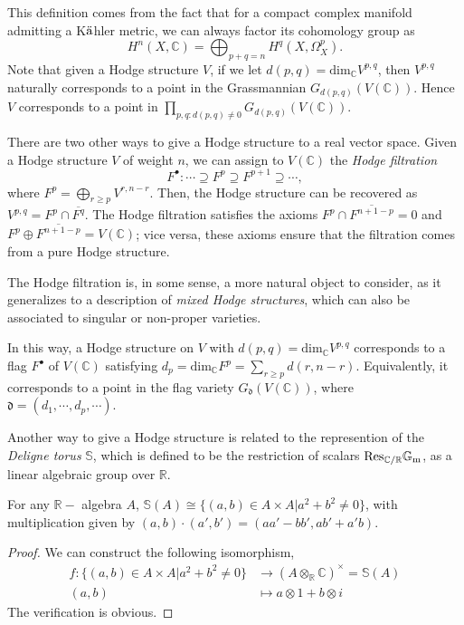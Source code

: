 \begin{remark}
 \label{remark-Hodge-structures}
 This definition comes from the fact that for a compact complex manifold admitting a K$\rm \ddot a$hler metric, we can always factor its cohomology group as
$$
H^n(X, \mathbb C)= \bigoplus _{ p+q=n}H^q(X, \Omega^p_X).
$$
Note that given a Hodge structure $V$, if we let $d(p,q)= \text{dim}_\mathbb C V^{p,q}$, then $V^{p,q}$ naturally corresponds to a point in the Grassmannian $G_{d(p,q)}(V(\mathbb C))$. Hence $V$ corresponds to a point in $\prod_{p,q:d(p,q)\ne 0} G_{d(p,q)}(V(\mathbb C))$.
\end{remark}

There are two other ways to give a Hodge structure to a real vector space. Given a Hodge structure $V$ of weight $n$, we can assign to $V(\mathbb  C)$ the {\it Hodge filtration}
$$
F^ \bullet : \cdots \supseteq F^p \supseteq F^{p+1} \supseteq \cdots,
$$
where $F^p = \bigoplus _{r \geq p} V^{r,n-r}$. Then, the Hodge structure can be recovered as $V^{p,q}=F^p \cap \overline{F^q}$. The Hodge filtration satisfies the axioms $F^p \cap \overline{F^{n+1-p}} = 0$ and $F^p \oplus \overline{F^{n+1-p}} = V(\mathbb C)$; vice versa, these axioms ensure that the filtration comes from a pure Hodge structure.

The Hodge filtration is, in some sense, a more natural object to consider, as it generalizes to a description of \emph{mixed Hodge structures}, which can also be associated to singular or non-proper varieties.

In this way, a Hodge structure on $V$ with $d(p,q)= \text{dim}_\mathbb C V^{p,q}$ corresponds to a flag $F^\bullet$ of $V(\mathbb C)$ satisfying $d_p=\text{dim}_\mathbb C F^p= \sum_{r \ge p} d(r,n-r)$.  Equivalently, it corresponds to a point in the flag variety $G_ \mathfrak d(V(\mathbb C)) $, where $\mathfrak d= (d_1,\cdots,d_p,\cdots)$.

Another way to give a Hodge structure is related to the represention of the {\it Deligne torus} $\mathbb S$, which is defined to be the restriction of scalars $\rm Res_{\mathbb C/ \mathbb R} \mathbb G_m$, as a linear algebraic group over $\mathbb R$.

\begin{lemma}
 \label{lemma-Deligne-torus}
  For any $\mathbb R-$ algebra $A$, $\mathbb S(A)\cong \{(a,b)\in A \times A| a^2+b^2 \ne 0\} $, with multiplication given by $(a,b)\cdot (a',b')=(aa'-bb',ab'+a'b)$.
\end{lemma} 

\begin{proof}
We can construct the following isomorphism, 
$$
\begin{align*}
f:\{(a,b)\in A \times A| a^2+b^2 \ne 0\} &\to (A \otimes _\mathbb R \mathbb C)^ \times=\mathbb S(A) \\
(a,b) &\mapsto a \otimes 1+b\otimes i
\end{align*}
$$
The verification is obvious.
\end{proof}

